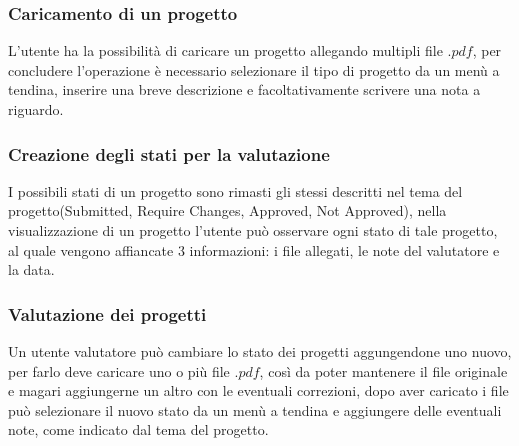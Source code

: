 \documentclass{article}
\begin{document}
\subsubsection{Caricamento di un progetto} 
L'utente ha la possibilità di caricare un progetto allegando multipli file $.pdf$, per concludere l'operazione è necessario selezionare il tipo di progetto da un menù a tendina, inserire una breve descrizione e facoltativamente scrivere una nota a riguardo.
\subsubsection{Creazione degli stati per la valutazione}
I possibili stati di un progetto sono rimasti gli stessi descritti nel tema del progetto(Submitted, Require Changes, Approved, Not Approved), nella visualizzazione di un progetto l'utente può osservare ogni stato di tale progetto, al quale vengono affiancate 3 informazioni: i file allegati, le note del valutatore e la data.
\subsubsection{Valutazione dei progetti}
Un utente valutatore può cambiare lo stato dei progetti aggungendone uno nuovo, per farlo deve caricare uno o più file $.pdf$, così da poter mantenere il file originale e magari aggiungerne un altro con le eventuali correzioni, dopo aver caricato i file può selezionare il nuovo stato da un menù a tendina e aggiungere delle eventuali note, come indicato dal tema del progetto. 
\end{document}
